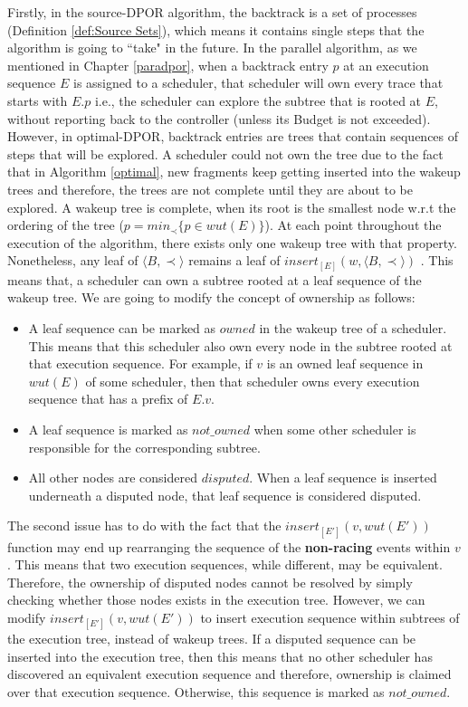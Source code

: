 Firstly, in the source-DPOR algorithm, the backtrack is a set of processes (Definition \ref{def:Source Sets}), which means it contains single steps that the algorithm is going to ``take" in the future. In the parallel algorithm, as we mentioned in Chapter \ref{paradpor}, when a backtrack entry $p$ at an execution sequence $E$ is assigned to a scheduler, that scheduler will own every trace that starts with $E.p$ i.e., the scheduler can explore the subtree that is rooted at $E$, without reporting back to the controller (unless its Budget is not exceeded). 
However, in optimal-DPOR, backtrack entries are trees that contain sequences of steps that will be explored. A scheduler could not own the tree due to the fact that in Algorithm \ref{optimal}, new fragments keep getting inserted into the wakeup trees and therefore, the trees are not complete until they are about to be explored. A wakeup tree is complete, when its root is the smallest node w.r.t the ordering of the tree ($p = min_{\prec}\{ p \in wut(E)\}$). At each point throughout the execution of the algorithm, there exists only one wakeup tree with that property. 
Nonetheless, any leaf of $\langle B , \prec \rangle$ remains a leaf of $insert_{[E]}(w,\langle B , \prec \rangle)$
\cite{AbdullaAronisJohnssonSagonasDPOR2014}. This means that, a scheduler can own a subtree rooted at a leaf sequence of the wakeup tree. We are going to modify the concept of ownership as follows:
\begin{itemize}
\item A leaf sequence can be marked as $owned$ in the wakeup tree of a scheduler. This means that this scheduler also own every node in the subtree rooted at that execution sequence. For example, if $v$ is an owned leaf sequence in $wut(E)$ of some scheduler, then that scheduler owns every execution sequence that has a prefix of $E.v$.
\item A leaf sequence is marked as $not\_owned$ when some other scheduler is responsible for the corresponding subtree.
\item All other nodes are considered $disputed$. When a leaf sequence is inserted underneath a disputed node, that leaf sequence is considered disputed.
\end{itemize}

The second issue has to do with the fact that the $insert_{[E']}(v,wut(E'))$ function may end up
rearranging the sequence of the \textbf{non-racing} events within $v$. This means that two execution sequences, while different,
may be equivalent. Therefore, the ownership of disputed nodes cannot be resolved by simply checking whether those nodes exists in the execution tree.
However, we can modify $insert_{[E']}(v,wut(E'))$ to insert execution sequence within subtrees of the execution tree, instead of wakeup trees. If a disputed sequence can be inserted into the execution tree, then this means that no other scheduler has discovered an equivalent execution sequence and therefore, ownership is claimed over that execution sequence. Otherwise, this sequence is marked as $not\_owned$.

